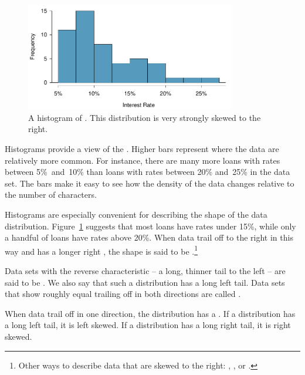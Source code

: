 \begin{figure}[bth]
   \centering
   \includegraphics[width=0.82\textwidth]{ch_summarizing_data/figures/loan50IntRateHist/loan50IntRateHist}
   \caption{A histogram of . This distribution is very strongly skewed to the right.}
   \label{loan50IntRateHist}
\end{figure}

Histograms provide a view of the .
Higher bars represent where the data are relatively more common.
For instance, there are many more loans with rates between
5\%~and~10\% than loans with rates between 20\% and~25\%
in the data set.
The bars make it easy to see how the density of the data
changes relative to the number of characters.

Histograms are especially convenient for describing the
shape of the data distribution\label{shapeFirstDiscussed}.
Figure~\ref{loan50IntRateHist} suggests that most loans
have rates under 15\%, while only a handful
of loans have rates above 20\%.
When data trail off to the right in this way
and has a longer right ,
the shape is said to be
.\footnote{Other
  ways to describe data that are skewed to the right:
  ,
  ,
  or .}

Data sets with the reverse characteristic --
a long, thinner tail to the left --
are said to be .
We also say that such a distribution has a long left tail.
Data sets that show roughly equal trailing off in both
directions are called .

\begin{termBox}{%
  When data trail off in one direction, the distribution
  has a . 
  If a distribution has a long left tail, it is left skewed.
  If a distribution has a long right tail, it is right skewed.}
\end{termBox}

